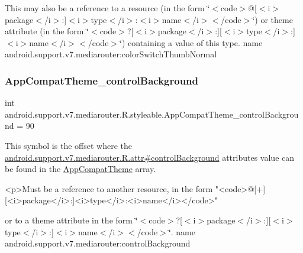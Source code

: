 This may also be a reference to a resource (in the form \char`\"{}$<$code$>$@\mbox{[}$<$i$>$package$<$/i$>$\+:\mbox{]}$<$i$>$type$<$/i$>$\+:$<$i$>$name$<$/i$>$$<$/code$>$\char`\"{}) or theme attribute (in the form \char`\"{}$<$code$>$?\mbox{[}$<$i$>$package$<$/i$>$\+:\mbox{]}\mbox{[}$<$i$>$type$<$/i$>$\+:\mbox{]}$<$i$>$name$<$/i$>$$<$/code$>$\char`\"{}) containing a value of this type.  name android.\+support.\+v7.\+mediarouter\+:color\+Switch\+Thumb\+Normal \mbox{\label{classandroid_1_1support_1_1v7_1_1mediarouter_1_1R_1_1styleable_a47c5659b0ee16f07cd6f1cf55cd650e3}} 
\subsubsection{\texorpdfstring{App\+Compat\+Theme\+\_\+control\+Background}{AppCompatTheme\_controlBackground}}
{\footnotesize\ttfamily int android.\+support.\+v7.\+mediarouter.\+R.\+styleable.\+App\+Compat\+Theme\+\_\+control\+Background = 90\hspace{0.3cm}{\ttfamily [static]}}

This symbol is the offset where the \hyperlink{classandroid_1_1support_1_1v7_1_1mediarouter_1_1R_1_1attr_a2979564b8ef31e5cdbaeefe947ce53dd}{android.\+support.\+v7.\+mediarouter.\+R.\+attr\#control\+Background} attribute\textquotesingle{}s value can be found in the \hyperlink{classandroid_1_1support_1_1v7_1_1mediarouter_1_1R_1_1styleable_a4e3d3900c75d49aeb2f283cac00214d6}{App\+Compat\+Theme} array.

\begin{DoxyVerb}      <p>Must be a reference to another resource, in the form "<code>@[+][<i>package</i>:]<i>type</i>:<i>name</i></code>"
\end{DoxyVerb}
 or to a theme attribute in the form \char`\"{}$<$code$>$?\mbox{[}$<$i$>$package$<$/i$>$\+:\mbox{]}\mbox{[}$<$i$>$type$<$/i$>$\+:\mbox{]}$<$i$>$name$<$/i$>$$<$/code$>$\char`\"{}.  name android.\+support.\+v7.\+mediarouter\+:control\+Background \mbox{\label{classandroid_1_1support_1_1v7_1_1mediarouter_1_1R_1_1styleable_a12d698145612528765b887b3bbbe63bb}} 
